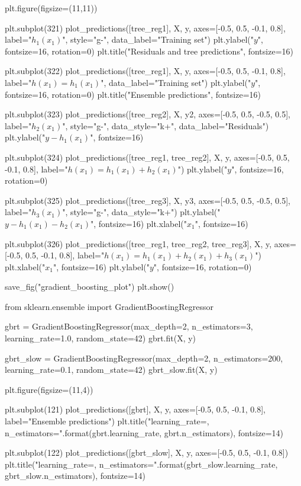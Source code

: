 \documentclass[%
oneside,                 %
final,                   %
10pt]{article}
\begin{document}
plt.figure(figsize=(11,11))

plt.subplot(321)
plot_predictions([tree_reg1], X, y, axes=[-0.5, 0.5, -0.1, 0.8], label="$h_1(x_1)$", style="g-", data_label="Training set")
plt.ylabel("$y$", fontsize=16, rotation=0)
plt.title("Residuals and tree predictions", fontsize=16)

plt.subplot(322)
plot_predictions([tree_reg1], X, y, axes=[-0.5, 0.5, -0.1, 0.8], label="$h(x_1) = h_1(x_1)$", data_label="Training set")
plt.ylabel("$y$", fontsize=16, rotation=0)
plt.title("Ensemble predictions", fontsize=16)

plt.subplot(323)
plot_predictions([tree_reg2], X, y2, axes=[-0.5, 0.5, -0.5, 0.5], label="$h_2(x_1)$", style="g-", data_style="k+", data_label="Residuals")
plt.ylabel("$y - h_1(x_1)$", fontsize=16)

plt.subplot(324)
plot_predictions([tree_reg1, tree_reg2], X, y, axes=[-0.5, 0.5, -0.1, 0.8], label="$h(x_1) = h_1(x_1) + h_2(x_1)$")
plt.ylabel("$y$", fontsize=16, rotation=0)

plt.subplot(325)
plot_predictions([tree_reg3], X, y3, axes=[-0.5, 0.5, -0.5, 0.5], label="$h_3(x_1)$", style="g-", data_style="k+")
plt.ylabel("$y - h_1(x_1) - h_2(x_1)$", fontsize=16)
plt.xlabel("$x_1$", fontsize=16)

plt.subplot(326)
plot_predictions([tree_reg1, tree_reg2, tree_reg3], X, y, axes=[-0.5, 0.5, -0.1, 0.8], label="$h(x_1) = h_1(x_1) + h_2(x_1) + h_3(x_1)$")
plt.xlabel("$x_1$", fontsize=16)
plt.ylabel("$y$", fontsize=16, rotation=0)

save_fig("gradient_boosting_plot")
plt.show()

from sklearn.ensemble import GradientBoostingRegressor

gbrt = GradientBoostingRegressor(max_depth=2, n_estimators=3, learning_rate=1.0, random_state=42)
gbrt.fit(X, y)

gbrt_slow = GradientBoostingRegressor(max_depth=2, n_estimators=200, learning_rate=0.1, random_state=42)
gbrt_slow.fit(X, y)

plt.figure(figsize=(11,4))

plt.subplot(121)
plot_predictions([gbrt], X, y, axes=[-0.5, 0.5, -0.1, 0.8], label="Ensemble predictions")
plt.title("learning_rate={}, n_estimators={}".format(gbrt.learning_rate, gbrt.n_estimators), fontsize=14)

plt.subplot(122)
plot_predictions([gbrt_slow], X, y, axes=[-0.5, 0.5, -0.1, 0.8])
plt.title("learning_rate={}, n_estimators={}".format(gbrt_slow.learning_rate, gbrt_slow.n_estimators), fontsize=14)
\end{document}
